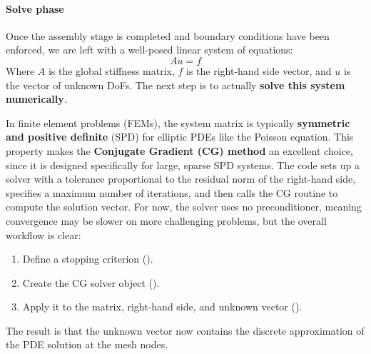 \paragraph{Solve phase}

Once the assembly stage is completed and boundary conditions have been enforced, we are left with a well-posed linear system of equations:
\begin{equation*}
    A u = f
\end{equation*}
Where $A$ is the global stiffness matrix, $f$ is the right-hand side vector, and $u$ is the vector of unknown DoFs. The next step is to actually \textbf{solve this system numerically}.

\highspace
In finite element problems (FEMs), the system matrix is typically \textbf{symmetric and positive definite} (SPD) for elliptic PDEs like the Poisson equation. This property makes the \textbf{Conjugate Gradient (CG) method} an excellent choice, since it is designed specifically for large, sparse SPD systems. The code sets up a solver with a tolerance proportional to the residual norm of the right-hand side, specifies a maximum number of iterations, and then calls the CG routine to compute the solution vector. For now, the solver uses no preconditioner, meaning convergence may be slower on more challenging problems, but the overall workflow is clear:
\begin{enumerate}
    \item Define a stopping criterion ().
    \item Create the CG solver object ().
    \item Apply it to the matrix, right-hand side, and unknown vector ().
\end{enumerate}
The result is that the unknown vector  now contains the discrete approximation of the PDE solution at the mesh nodes.

